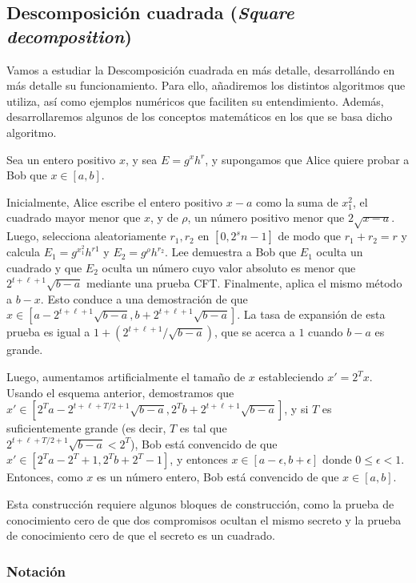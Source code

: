\subsection{Descomposición cuadrada (\emph{Square decomposition})}

Vamos a estudiar la Descomposición cuadrada en más detalle, desarrollándo en más detalle su funcionamiento. Para ello, añadiremos los distintos algoritmos que utiliza, así como ejemplos numéricos que faciliten su entendimiento. Además, desarrollaremos algunos de los conceptos matemáticos en los que se basa dicho algoritmo.

Sea un entero positivo $x$, y sea $E = g^{x}h^{r}$, y supongamos que Alice quiere probar a Bob que $x \in [a, b]$.

Inicialmente, Alice escribe el entero positivo $x-a$ como la suma de $x_{1}^{2}$, el cuadrado mayor menor que $x$, y de $\rho$, un número positivo menor que $2\sqrt{x-a}$. Luego, selecciona aleatoriamente $r_{1}, r_{2}$ en $[0, 2^{s}n-1]$ de modo que $r_{1} + r_{2} = r$ y calcula $E_{1} = g^{x_{1}^{2}}h^{r{1}}$ y $E_{2} = g^{\rho}h^{r_{2}}$. Lee demuestra a Bob que $E_{1}$ oculta un cuadrado y que $E_{2}$ oculta un número cuyo valor absoluto es menor que $2^{t+\ell+1}\sqrt{b-a}$ mediante una prueba CFT. Finalmente, aplica el mismo método a $b-x$. Esto conduce a una demostración de que $x \in [a - 2^{t+\ell+1}\sqrt{b-a}, b + 2^{t+\ell+1}\sqrt{b-a}]$. La tasa de expansión de esta prueba es igual a $1 + (2^{t+\ell+1}/\sqrt{b-a})$, que se acerca a $1$ cuando $b-a$ es grande.

Luego, aumentamos artificialmente el tamaño de $x$ estableciendo $x' = 2^{T}x$. Usando el esquema anterior, demostramos que $x' \in [2^{T}a - 2^{t+\ell+T / 2+1} \sqrt{b-a}, 2^{T}b + 2^{t+\ell+1} \sqrt{b-a}]$, y si $T$ es suficientemente grande (es decir, $T$ es tal que \\ $2^{t+\ell+T/2+1} \sqrt{b-a} < 2^{T}$), Bob está convencido de que $x' \in [2^{T}a - 2^{T} + 1, 2^{T}b + 2^{T} - 1]$, y entonces $x \in [a - \epsilon, b + \epsilon]$ donde $0 \leq \epsilon < 1$. Entonces, como $x$ es un número entero, Bob está convencido de que $x \in [a, b]$.

Esta construcción requiere algunos bloques de construcción, como la prueba de conocimiento cero de que dos compromisos ocultan el mismo secreto y la prueba de conocimiento cero de que el secreto es un cuadrado.

\subsubsection{Notación}

